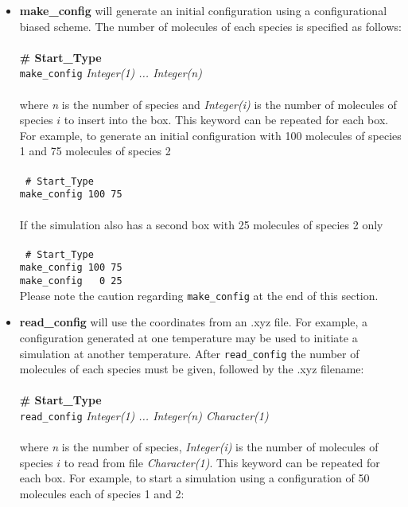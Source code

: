 \begin{itemize} 
\item \textbf{make\_config} will generate an initial configuration using a configurational biased scheme. 
The number of molecules of each species is specified as follows: \\ \\
%
{\bf \# Start\_Type} \\
{\tt make\_config} {\it Integer(1) ... Integer(n)} \\ \\
%
where {\it n} is the number of species and {\it Integer(i)} is the number of molecules of species $i$ to insert into the box. 
This keyword can be repeated for each box. 
For example, to generate an initial configuration with 100 molecules of species 1 and 75 molecules of species 2 \\ \\
%
 \texttt{
 \# Start\_Type \\
 make\_config 100 75 \\} \\
%
If the simulation also has a second box with 25 molecules of species 2 only \\ \\
%
 \texttt{
 \# Start\_Type \\
 make\_config 100 75\\
 make\_config \ \ 0 25\\}
%
Please note the caution regarding {\tt make\_config} at the end of this section. \\
%
\item {\textbf{read\_config}} will use the coordinates from an .xyz file.
For example, a configuration generated at one temperature may be used to initiate a simulation at another temperature. 
After {\tt read\_config} the number of molecules of each species must be given, followed by the .xyz filename: \\ \\
%
{\bf \# Start\_Type} \\
{\tt read\_config} {\it Integer(1) ... Integer(n) Character(1)}\\ \\
%
where {\it n} is the number of species, {\it Integer(i)} is the number of molecules 
of species $i$ to read from file {\it Character(1)}.
This keyword can be repeated for each box. 
For example, to start a simulation using a configuration of 50 molecules each of species 1 and 2: \\ \\

\end{itemize}
